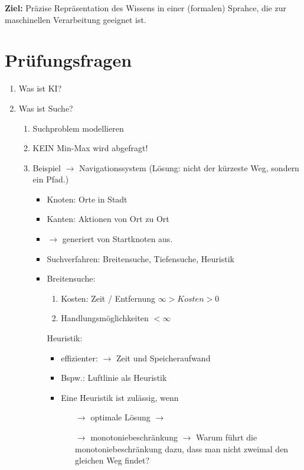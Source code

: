 \documentclass[runningheads,deutsch]{llncs}
\begin{document}
\textbf{Ziel:} Präzise Repräsentation des Wissens in einer (formalen) Sprahce, die zur maschinellen Verarbeitung geeignet ist.

\pagebreak

\section{Prüfungsfragen}
\begin{enumerate}
    \item Was ist KI?
    \item Was ist Suche?
    \begin{enumerate}
        \item Suchproblem modellieren
        \item KEIN Min-Max wird abgefragt!
        \item Beispiel $\rightarrow$ Navigationssystem (Lösung: nicht der kürzeste Weg, sondern ein Pfad.)
        \begin{itemize}
            \item Knoten: Orte in Stadt
            \item Kanten: Aktionen von Ort zu Ort
            \item $\rightarrow$ generiert von Startknoten aus.
            \item Suchverfahren: Breitensuche, Tiefensuche, Heuristik
            \item Breitensuche:
            \begin{enumerate}
                \item Kosten: Zeit / Entfernung $\infty > Kosten > 0$
                \item Handlungsmöglichkeiten $< \infty$
            \end{enumerate}
            Heuristik:
            \begin{itemize}
                \item effizienter: $\rightarrow$ Zeit und Speicheraufwand
                \item Bspw.: Luftlinie als Heuristik
                \item Eine Heuristik ist zulässig, wenn
                \begin{itemize}
                    \item[$\rightarrow$] optimale Lösung $\rightarrow$ 
                    \item[$\rightarrow$] monotoniebeschränkung $\rightarrow$ Warum führt die monotoniebeschränkung dazu, dass man nicht zweimal den gleichen Weg findet? 

\end{itemize}
\end{itemize}
\end{itemize}
\end{enumerate}
\end{enumerate}
\end{document}

